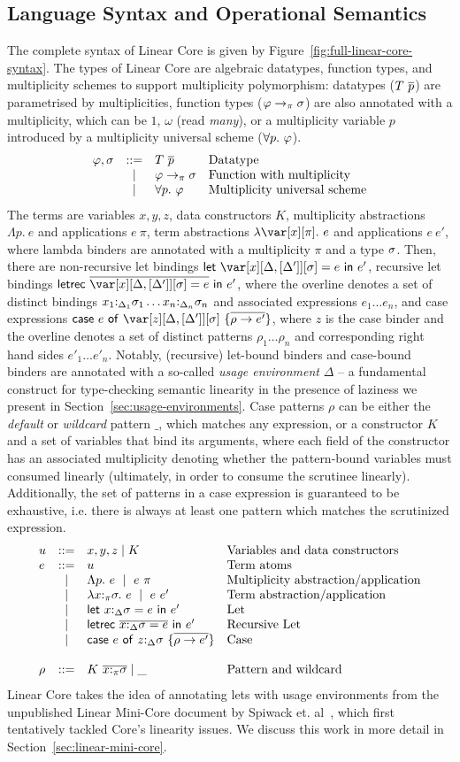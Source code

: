\documentclass[acmsmall,review]{acmart}
\newcommand{\llet}[2]{\mathsf{let}~#1~\mathsf{in}~#2}
\newcommand{\lletrec}[2]{\mathsf{letrec}~#1~\mathsf{in}~#2}
\newcommand{\ccase}[2]{\mathsf{case}~#1~\mathsf{of}~#2}
\begin{document}

\subsection{Language Syntax and Operational Semantics}

The complete syntax of Linear Core is given by Figure~\ref{fig:full-linear-core-syntax}.
%
The types of Linear Core are algebraic datatypes, function types, and
multiplicity schemes to support multiplicity polymorphism: datatypes
($T~\overline{p}$) are parametrised by multiplicities, function types
($\varphi\to_\pi\sigma$) are also annotated with a multiplicity, which can be $1$,
$\omega$ (read \emph{many}), or a multiplicity variable $p$ introduced by a
multiplicity universal scheme ($\forall p.~\varphi$).
%
\[
 \begin{array}{lcll} \varphi,\sigma & ::= & T~\overline{p} & \textrm{Datatype} \\ & \mid & \varphi \to_\pi \sigma & \textrm{Function with multiplicity}\\ & \mid & \forall p.~\varphi & \textrm{Multiplicity universal scheme}\\ \end{array} 
\]
%
The terms are variables $x,y,z$, data constructors $K$, multiplicity
abstractions $\Lambda p.~e$ and applications $e~\pi$, term abstractions
$\lambda \x[\pi].~e$ and applications $e~e'$, where lambda binders are
annotated with a multiplicity $\pi$ and a type $\sigma$. Then, there are
non-recursive let bindings $\llet{\xD = e}{e'}$, recursive let bindings
$\lletrec{\ov{\xD = e}}{e'}$, where the overline denotes a set of distinct
bindings $x_1{:}_{\Delta_1}\sigma_1\dots x_n{:}_{\Delta_n}\sigma_n$ and associated expressions
$e_1\dots e_n$, and case expressions $\ccase{e}{\zD~\{\ov{\rho \to e'}\}}$,
where $z$ is the case binder and the overline denotes a set of distinct
patterns $\rho_1\dots \rho_n$ and corresponding right hand sides $e'_1\dots
e'_n$. Notably, (recursive) let-bound
binders and case-bound binders are annotated
with a so-called \emph{usage environment} $\Delta$ -- a fundamental construct
for type-checking semantic linearity in the presence of laziness we present in
Section~\ref{sec:usage-environments}.
%
Case patterns $\rho$ can be either the \emph{default} or \emph{wildcard}
pattern $\_$, which matches any expression, or a constructor $K$ and a set of
variables that bind its arguments, where each field of the constructor has an
associated multiplicity denoting whether the pattern-bound variables must
consumed linearly (ultimately, in order to consume the scrutinee linearly).
Additionally, the set of patterns in a case expression is guaranteed to be exhaustive,
i.e. there is always at least one pattern which matches the scrutinized expression.
\[
\SyntaxTerms
\]
Linear Core takes the idea of annotating lets with usage environments from the
unpublished Linear Mini-Core document by Spiwack et.
al~\cite{cite:minicore}, which first tentatively tackled Core's
linearity issues. We discuss this work in more detail in
Section~\ref{sec:linear-mini-core}.
\end{document}
